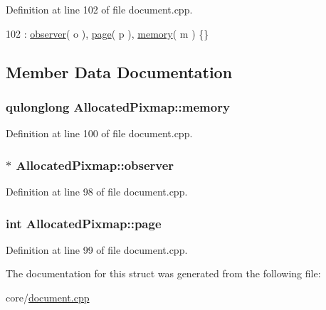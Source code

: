 Definition at line 102 of file document.\+cpp.


\begin{DoxyCode}
102 : \hyperlink{structAllocatedPixmap_a5ee1fe9a6b1a37583c0ea54045cc7800}{observer}( o ), \hyperlink{structAllocatedPixmap_a197c0639216aa0819deb72fd8705d115}{page}( p ), \hyperlink{structAllocatedPixmap_a8fdfc9d87d0ce0852716295895606be0}{memory}( m ) \{\}
\end{DoxyCode}


\subsection{Member Data Documentation}
\hypertarget{structAllocatedPixmap_a8fdfc9d87d0ce0852716295895606be0}{
\subsubsection[{memory}]{\setlength{\rightskip}{0pt plus 5cm}qulonglong Allocated\+Pixmap\+::memory}}\label{structAllocatedPixmap_a8fdfc9d87d0ce0852716295895606be0}


Definition at line 100 of file document.\+cpp.

\hypertarget{structAllocatedPixmap_a5ee1fe9a6b1a37583c0ea54045cc7800}{
\subsubsection[{observer}]{$\ast$ Allocated\+Pixmap\+::observer}}\label{structAllocatedPixmap_a5ee1fe9a6b1a37583c0ea54045cc7800}


Definition at line 98 of file document.\+cpp.

\hypertarget{structAllocatedPixmap_a197c0639216aa0819deb72fd8705d115}{
\subsubsection[{page}]{\setlength{\rightskip}{0pt plus 5cm}int Allocated\+Pixmap\+::page}}\label{structAllocatedPixmap_a197c0639216aa0819deb72fd8705d115}


Definition at line 99 of file document.\+cpp.



The documentation for this struct was generated from the following file\+:\begin{DoxyCompactItemize}
\item 
core/\hyperlink{core_2document_8cpp}{document.\+cpp}\end{DoxyCompactItemize}
